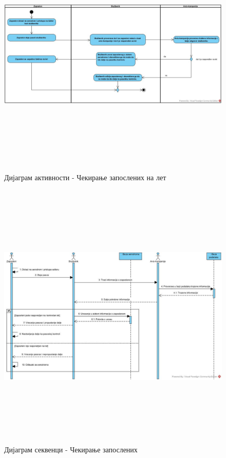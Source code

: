 \documentclass{article}
\begin{document}
\begin{figure}[H]
    \centering
    \includegraphics[width=1.1\textwidth, height=12cm]{Dijagrami_slike/cekiranje_zaposlenih.jpg}
    \caption{Дијаграм активности - Чекирање запослених на лет}
\end{figure}

\begin{figure}[H]
    \begin{center}
        \includegraphics[width=1.1\textwidth, height=13cm]{Dijagrami_slike/ds_cekiranje_zaposlenih.jpg}
        \caption{Дијаграм секвенци - Чекирање запослених}
    \end{center}
\end{figure}
\end{document}
